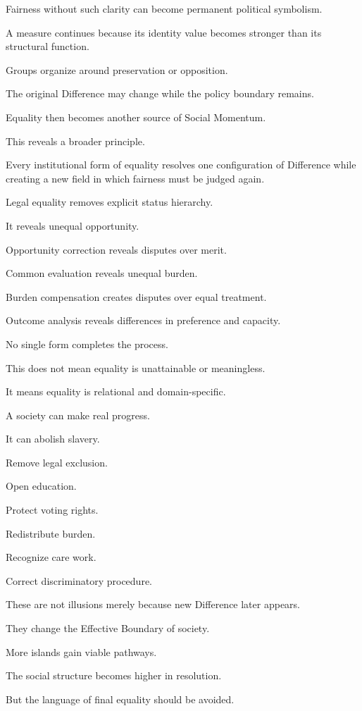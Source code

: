 Fairness without such clarity can become permanent political symbolism.

A measure continues because its identity value becomes stronger than its structural function.

Groups organize around preservation or opposition.

The original Difference may change while the policy boundary remains.

Equality then becomes another source of Social Momentum.

This reveals a broader principle.

Every institutional form of equality resolves one configuration of Difference while creating a new field in which fairness must be judged again.

Legal equality removes explicit status hierarchy.

It reveals unequal opportunity.

Opportunity correction reveals disputes over merit.

Common evaluation reveals unequal burden.

Burden compensation creates disputes over equal treatment.

Outcome analysis reveals differences in preference and capacity.

No single form completes the process.

This does not mean equality is unattainable or meaningless.

It means equality is relational and domain-specific.

A society can make real progress.

It can abolish slavery.

Remove legal exclusion.

Open education.

Protect voting rights.

Redistribute burden.

Recognize care work.

Correct discriminatory procedure.

These are not illusions merely because new Difference later appears.

They change the Effective Boundary of society.

More islands gain viable pathways.

The social structure becomes higher in resolution.

But the language of final equality should be avoided.

